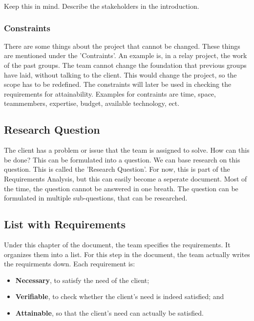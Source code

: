 \documentclass[10pt]{report}
\begin{document}
\noindent Keep this in mind. Describe the stakeholders in the introduction.

\subsubsection{Constraints}

There are some things about the project that cannot be changed. These things are mentioned under the 'Contraints'. An example is, in a relay project, the work of the past groups. The team cannot change the foundation that previous groups have laid, without talking to the client. This would change the project, so the scope has to be redefined. The constraints will later be used in checking the requirements for attainability. Examples for contraints are time, space, teammembers, expertise, budget, available technology, ect.

\subsection{Research Question}

The client has a problem or issue that the team is assigned to solve. How can this be done? This can be formulated into a question. We can base research on this question. This is called the 'Research Question'. For now, this is part of the Requirements Analysis, but this can easily become a seperate document. Most of the time, the question cannot be answered in one breath. The question can be formulated in multiple sub-questions, that can be researched.

\subsection{List with Requirements}

Under this chapter of the document, the team specifies the requirements. It organizes them into a list. For this step in the document, the team actually writes the requirments down. Each requirement is:

\begin{itemize}
	\item \textbf{Necessary}, to satisfy the need of the client;
	\item \textbf{Verifiable}, to check whether the client's need is indeed satisfied; and
	\item \textbf{Attainable}, so that the client's need can actually be satisfied. 
\end{itemize}
\end{document}
